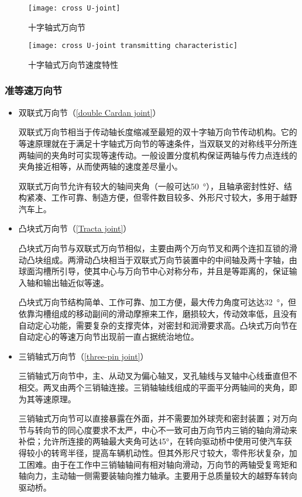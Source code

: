 \documentclass[UTF8]{ctexart}
\numberwithin{figure}{section}
\numberwithin{table}{section}
\begin{document}
\begin{figure}[htbp]
	\centering
	\begin{minipage}[b]{0.35\textwidth}
		\centering
		\texttt{[image: cross U-joint]}
		\caption{十字轴式万向节}
		\label{cross U-joint}
	\end{minipage}
	\begin{minipage}[b]{0.55\textwidth}
		\centering
		\texttt{[image: cross U-joint transmitting characteristic]}
		\caption{十字轴式万向节速度特性}
		\label{cross U-joint transmitting characteristic}
	\end{minipage}
\end{figure}

\subsubsection{准等速万向节}

\begin{itemize}
	\item 双联式万向节（\cref{double Cardan joint}）

	      双联式万向节相当于传动轴长度缩减至最短的双十字轴万向节传动机构。它的等速原理就在于满足十字轴式万向节的等速条件，当双联叉的对称线平分所连两轴间的夹角时可实现等速传动。一般设置分度机构保证两轴与传力点连线的夹角接近相等，从而使两轴的速度差尽量小。

	      双联式万向节允许有较大的轴间夹角（一般可达\SI{50}{\degree}），且轴承密封性好、结构紧凑、工作可靠、制造方便，但零件数目较多、外形尺寸较大，多用于越野汽车上。

	\item 凸块式万向节（\cref{Tracta joint}）

	      凸块式万向节与双联式万向节相似，主要由两个万向节叉和两个连扣互锁的滑动凸块组成。两滑动凸块相当于双联式万向节装置中的中间轴及两十字轴，由球面沟槽所引导，使其中心与万向节中心对称分布，并且是等距离的，保证输入轴和输出轴近似等速。

	      凸块式万向节结构简单、工作可靠、加工方便，最大传力角度可达达\SI{32}{\degree}，但依靠沟槽组成的移动副间的滑动摩擦来工作，磨损较大，传动效率低，且没有自动定心功能，需要复杂的支撑壳体，对密封和润滑要求高。凸块式万向节在自动定心的等速万向节出现前一直占据统治地位。

	\item 三销轴式万向节（\cref{three-pin joint}）

	      三销轴式万向节中，主、从动叉为偏心轴叉，叉孔轴线与叉轴中心线垂直但不相交。两叉由两个三销轴连接。三销轴轴线组成的平面平分两轴间的夹角，即为其等速原理。

	      三销轴式万向节可以直接暴露在外面，并不需要加外球壳和密封装置；对万向节与转向节的同心度要求不太严，中心不一致可由万向节内三销的轴向滑动来补偿；允许所连接的两轴最大夹角可达45°，在转向驱动桥中使用可使汽车获得较小的转弯半径，提高车辆机动性。但其外形尺寸较大，零件形状复杂，加工困难。由于在工作中三销轴轴间有相对轴向滑动，万向节的两轴受复弯矩和轴向力，主动轴一侧需要装轴向推力轴承。主要用于总质量较大的越野车转向驱动桥。
\end{itemize}
\end{document}
